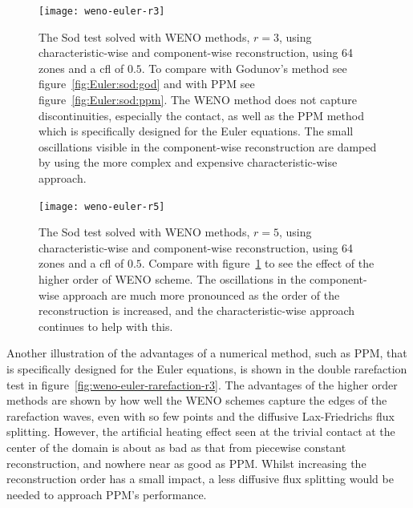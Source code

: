 \begin{figure}[t]
\centering
\texttt{[image: weno-euler-r3]}
\caption[WENO $r=3$ for the Sod test]
{\label{fig:weno-euler-r3} The Sod test solved with WENO methods, $r=3$, using characteristic-wise and component-wise reconstruction, using 64 zones and a cfl of $0.5$. To compare with Godunov's method see figure~\ref{fig:Euler:sod:god} and with PPM see figure~\ref{fig:Euler:sod:ppm}. The WENO method does not capture discontinuities, especially the contact, as well as the PPM method which is specifically designed for the Euler equations. The small oscillations visible in the component-wise reconstruction are damped by using the more complex and expensive characteristic-wise approach. \\
}
\end{figure}
%

\begin{figure}[t]
\centering
\texttt{[image: weno-euler-r5]}
\caption[WENO $r=5$ for the Sod test]
{\label{fig:weno-euler-r5} The Sod test solved with WENO methods, $r=5$, using characteristic-wise and component-wise reconstruction, using 64 zones and a cfl of $0.5$. Compare with figure~\ref{fig:weno-euler-r3} to see the effect of the higher order of WENO scheme. The oscillations in the component-wise approach are much more pronounced as the order of the reconstruction is increased, and the characteristic-wise approach continues to help with this. \\
}
\end{figure}
%

Another illustration of the advantages of a numerical method, such as PPM, that
is specifically designed for the Euler equations, is shown in the double
rarefaction test in figure~\ref{fig:weno-euler-rarefaction-r3}. The
advantages of the higher order methods are shown by how well the WENO schemes
capture the edges of the rarefaction waves, even with so few points and the
diffusive Lax-Friedrichs flux splitting. However, the artificial heating effect
seen at the trivial contact at the center of the domain is about as bad as that
from piecewise constant reconstruction, and nowhere near as good as PPM. Whilst
increasing the reconstruction order has a small impact, a less diffusive flux
splitting would be needed to approach PPM's performance.

